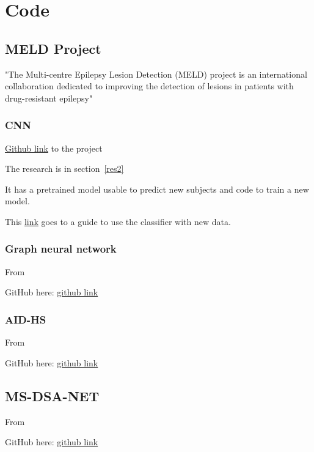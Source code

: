 \chapter{Code}

\section{MELD Project}

"The Multi-centre Epilepsy Lesion Detection (MELD) project is an international collaboration dedicated to improving the detection of lesions in patients with drug-resistant epilepsy"

\subsection{CNN}
\label{code:res2}

\href{https://github.com/MELDProject/meld_classifier}{Github link} to the project

The research is in section~\ref{res2}

It has a pretrained model usable to predict new subjects and code to train a new model.

This \href{https://docs.google.com/document/d/1vF5U1i-B45OkE_8wdde8yHHypp6W9xNN_1DBoEGmn0E/edit?tab=t.0}{link} goes to a guide to use the classifier with new data.

\subsection{Graph neural network}
\label{code:res13}

From 

GitHub here: \href{https://github.com/meldproject/meld_graph?tab=readme-ov-file}{github link}

\subsection{AID-HS}
\label{code:hs1}

From 

GitHub here: \href{https://github.com/MELDproject/AID-HS}{github link}

\section{MS-DSA-NET}
\label{code:res8}

From 

GitHub here: \href{https://github.com/zhangxd0530/MS-DSA-NET}{github link}

